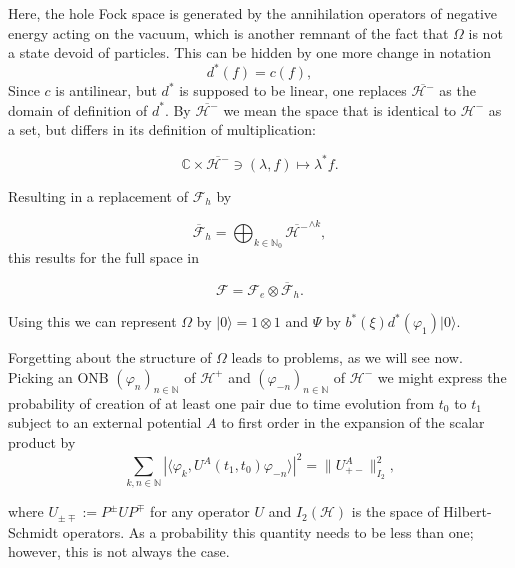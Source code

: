\documentclass[b5paper,draft,openbib,12pt]{memoir}
\begin{document}
Here, the hole Fock space is generated by the annihilation 
operators of negative energy acting on the vacuum, which is 
another remnant of 
the fact that \(\Omega\) is not a state devoid of particles.
This can be hidden by one more change in notation
\begin{equation}
d^*(f)= c(f),
\end{equation}
Since \(c\) is antilinear, but \(d^*\) is supposed to be linear, one 
replaces \(\overline{\mathcal{H}^-}\) as the domain of definition of \(d^*\).
By \(\overline{\mathcal{H}^-}\) we mean the space that is identical to 
\(\mathcal{H}^-\) as a set, but differs in its definition of multiplication:

\begin{equation}
\mathbb{C}\times \overline{\mathcal{H}^-} \ni (\lambda, f)\mapsto \lambda^* f.
\end{equation}

Resulting in a replacement of \(\mathcal{F}_h\) by 

\begin{equation}
\overline{\mathcal{F}}_h=\bigoplus_{k\in\mathbb{N}_0} \overline{\mathcal{H}^-}^{\wedge k},
\end{equation}
this results for the full space in 

\begin{equation}
\mathcal{F}= \mathcal{F}_e \otimes \overline{\mathcal{F}}_h.
\end{equation}

Using this we can represent \(\Omega\) by \(|0\rangle = 1\otimes 1\)
and \(\Psi\) by \(b^*(\xi)d^*(\varphi_1)|0\rangle \). 

Forgetting about the structure of \(\Omega\) leads to problems, 
as we will see now. Picking an ONB \((\varphi_{n})_{n\in\mathbb{N}}\)
of \(\mathcal{H}^+\) and \((\varphi_{-n})_{n\in\mathbb{N}}\)
of \(\mathcal{H}^-\) we might express the probability of 
creation of at least one pair due to time evolution from \(t_0\)
to \(t_1\)  
subject to an external 
potential \(A\) to first order in the expansion of 
the scalar product by 
\begin{equation}\label{pair creation prob}
\sum_{k,n\in\mathbb{N}}|\langle \varphi_k,U^A(t_1,t_0) \varphi_{-n}\rangle|^2
=\|U^A_{+-}\|^2_{I_2},
\end{equation}

where \(U_{\pm \mp}:= P^\pm U P^\mp\) for any operator \(U\)
and \(I_2(\mathcal{H})\) is the space of Hilbert-Schmidt operators.
As a probability this quantity needs to be less than one; however,
this is not always the case.
\end{document}
